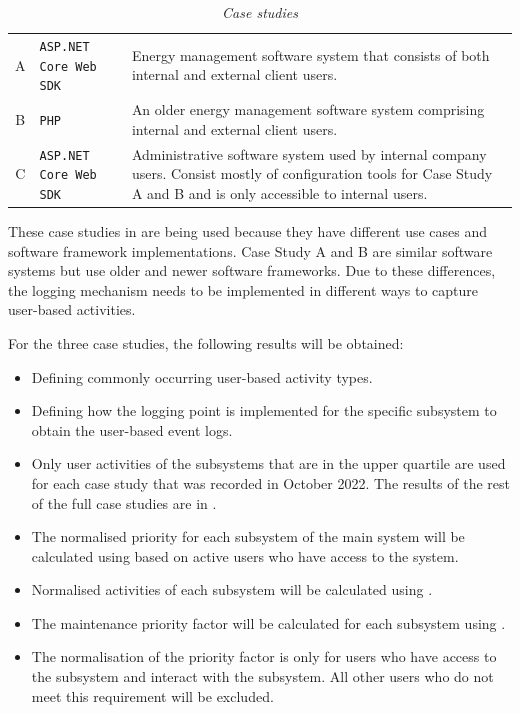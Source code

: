 \begin{table}[!htb]
	\centering
	\caption[Case studies]
	{\textit{Case studies}}
	\label{tbl:ch3_caseStudies}
	\begin{tabularx}{\textwidth}{clX}
		\toprule
		\thead{Case study} & \thead{Software framework} & \thead{Description} \\
		\midrule
		\rowcolor{lightgray}
		A & \texttt{ASP.NET Core Web SDK} & \RaggedRight Energy management software system that consists of both internal and external client users. \\
		B & \texttt{PHP} & \RaggedRight An older energy management software system comprising internal and external client users. \\
		\rowcolor{lightgray}
		C & \texttt{ASP.NET Core Web SDK} & \RaggedRight Administrative software system used by internal company users. Consist mostly of configuration tools for Case Study A and B and is only accessible to internal users. \\
		\bottomrule
	\end{tabularx}
\end{table}

These case studies in  are being used because they have different use cases and software framework implementations. Case Study A and B are similar software systems but use older and newer software frameworks. Due to these differences, the logging mechanism needs to be implemented in different ways to capture user-based activities. \par For the three case studies, the following results will be obtained:

\begin{itemize}
\item Defining commonly occurring user-based activity types.
\item Defining how the logging point is implemented for the specific subsystem to obtain the user-based event logs.
\item Only user activities of the subsystems that are in the upper quartile are used for each case study that was recorded in October 2022. The results of the rest of the full case studies are in .
\item The normalised priority for each subsystem of the main system will be calculated using  based on active users who have access to the system.
\item Normalised activities of each subsystem will be calculated using .
\item The maintenance priority factor will be calculated for each subsystem using .
\item The normalisation of the priority factor is only for users who have access to the subsystem and interact with the subsystem. All other users who do not meet this requirement will be excluded.
\end{itemize}

